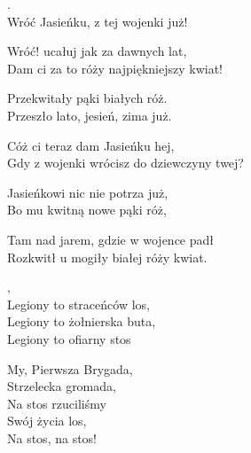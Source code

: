 \documentclass[12pt,a4paper,twoside]{songbook}
\begin{document}

  \begin{info}
    \lipsum[1]
  \end{info}
  \setlength{\vgap}{10pt}
  \begin{lyrics}[longestline={Gdy z wojenki wrócisz do dziewczyny twej?}]
    .\\
    Wróć Jasieńku, z tej wojenki już!\\
    \begin{bis}%
      Wróć! ucałuj jak za dawnych lat,\\
      Dam ci za to róży najpiękniejszy kwiat!
    \end{bis}
    
    Przekwitały pąki białych róż.\\
    Przeszło lato, jesień, zima już.\\
    \begin{bis}%
      Cóż ci teraz dam Jasieńku hej,\\
      Gdy z wojenki wrócisz do dziewczyny twej?
    \end{bis}
    
    Jasieńkowi nic nie potrza już,\\
    Bo mu kwitną nowe pąki róż,\\
    \begin{bis}%
      Tam nad jarem, gdzie w wojence padł\\
      Rozkwitł u mogiły białej róży kwiat.
    \end{bis}
  \end{lyrics}


  \begin{info}
    \lipsum[1]
  \end{info}

  \begin{lyrics}[longestline=Legiony to straceńców los]
  , \\
  Legiony to straceńców los, \\
  Legiony to żołnierska buta, \\
  Legiony to ofiarny stos
  
  My, Pierwsza Brygada,\\
  Strzelecka gromada,\\
  Na stos rzuciliśmy\\
  Swój życia los,\\
  Na stos, na stos!
  \end{lyrics}
\end{document}
